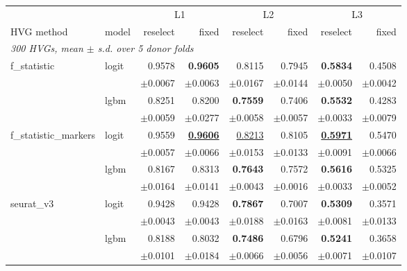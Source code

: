 \begin{table}[t]
\centering
\small
\begin{tabular}{llrrrrrr}
\toprule
 &  & \multicolumn{2}{c}{L1} & \multicolumn{2}{c}{L2} & \multicolumn{2}{c}{L3} \\
\cmidrule(lr){3-4}\cmidrule(lr){5-6}\cmidrule(lr){7-8}
HVG method & model & reselect & fixed & reselect & fixed & reselect & fixed \\
\midrule
\multicolumn{8}{l}{\emph{300 HVGs, mean $\pm$ s.d. over 5 donor folds}} \\
f\_statistic & logit & 0.9578 & \textbf{0.9605} & 0.8115 & 0.7945 & \textbf{0.5834} & 0.4508 \\
 &  & {\scriptsize$\pm$0.0067} & {\scriptsize$\pm$0.0063} & {\scriptsize$\pm$0.0167} & {\scriptsize$\pm$0.0144} & {\scriptsize$\pm$0.0050} & {\scriptsize$\pm$0.0042} \\[1pt]
 & lgbm & 0.8251 & 0.8200 & \textbf{0.7559} & 0.7406 & \textbf{0.5532} & 0.4283 \\
 &  & {\scriptsize$\pm$0.0059} & {\scriptsize$\pm$0.0277} & {\scriptsize$\pm$0.0058} & {\scriptsize$\pm$0.0057} & {\scriptsize$\pm$0.0033} & {\scriptsize$\pm$0.0079} \\[1pt]
\addlinespace
f\_statistic\_markers & logit & 0.9559 & \underline{\textbf{0.9606}} & \underline{0.8213} & 0.8105 & \underline{\textbf{0.5971}} & 0.5470 \\
 &  & {\scriptsize$\pm$0.0057} & {\scriptsize$\pm$0.0066} & {\scriptsize$\pm$0.0153} & {\scriptsize$\pm$0.0133} & {\scriptsize$\pm$0.0091} & {\scriptsize$\pm$0.0066} \\[1pt]
 & lgbm & 0.8167 & 0.8313 & \textbf{0.7643} & 0.7572 & \textbf{0.5616} & 0.5325 \\
 &  & {\scriptsize$\pm$0.0164} & {\scriptsize$\pm$0.0141} & {\scriptsize$\pm$0.0043} & {\scriptsize$\pm$0.0016} & {\scriptsize$\pm$0.0033} & {\scriptsize$\pm$0.0052} \\[1pt]
\addlinespace
seurat\_v3 & logit & 0.9428 & 0.9428 & \textbf{0.7867} & 0.7007 & \textbf{0.5309} & 0.3571 \\
 &  & {\scriptsize$\pm$0.0043} & {\scriptsize$\pm$0.0043} & {\scriptsize$\pm$0.0188} & {\scriptsize$\pm$0.0163} & {\scriptsize$\pm$0.0081} & {\scriptsize$\pm$0.0133} \\[1pt]
 & lgbm & 0.8188 & 0.8032 & \textbf{0.7486} & 0.6796 & \textbf{0.5241} & 0.3658 \\
 &  & {\scriptsize$\pm$0.0101} & {\scriptsize$\pm$0.0184} & {\scriptsize$\pm$0.0066} & {\scriptsize$\pm$0.0056} & {\scriptsize$\pm$0.0071} & {\scriptsize$\pm$0.0107} \\[1pt]

\end{tabular}
\end{table}

